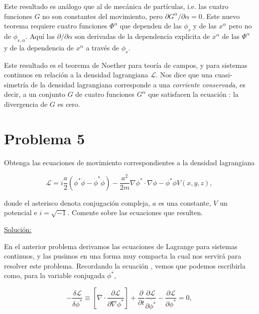 \documentclass[a4paper,10pt]{article}
\numberwithin{equation}{section}
\begin{document}
Este resultado es análogo que al de mecánica de partículas, i.e. las cuatro funciones 
$G$ no son constantes del movimiento, pero $\partial G^\alpha / \partial \alpha = 0$. Este nuevo 
teorema requiere cuatro funciones $\Phi^\alpha$ que dependen de las $\phi_s$ y de las 
$x^\alpha$ pero no de $\phi_{s,\alpha}$. Aquí las $\partial/\partial \alpha$ son derivadas 
de la dependencia explícita de $x^\alpha$ de las $\Phi^\alpha$ y de la dependencia de 
$x^\alpha$ a través de $\phi_s$. 

\vspace{.3cm}

Este resultado es el teorema de Noether para teoría de campos, y para sistemas continuos 
en relación a la densidad lagrangiana $\mathcal{L}$. Nos dice que una cuasi-simetría 
de la densidad lagrangiana corresponde a una \emph{corriente conservada}, es decir, 
a un conjunto $G$ de cuatro funciones $G^\alpha$ que satisfacen la ecuación 
: la divergencia de $G$ es cero.


\section{Problema 5}

Obtenga las ecuaciones de movimiento correspondientes a la densidad lagrangiana 

$$
\mathcal{L} = i\frac{a}{2} \left( \phi^*\dot{\phi} - \dot{\phi}^*\phi \right)  
- \frac{a^2}{2m}\nabla \phi^* \cdot \nabla \phi - \phi^*\phi V(x,y,z),
$$

donde el asterisco denota conjugación compleja, $a$ es una constante, $V$ un 
potencial e $i=\sqrt{-1}$. Comente sobre las ecuaciones que resulten.

\vspace{.3cm}

\underline{Solución:} \vspace{.3cm}

En el anterior problema derivamos las ecuaciones de Lagrange para sistemas continuos, 
y las pusimos en una forma muy compacta la cual nos servirá para resolver este problema. 
Recordando la ecuación , vemos que podemos escribirla como, para 
la variable conjugada $\phi^*$,

\begin{equation}
 - \frac{\delta \mathcal{L}}{\delta \phi^*} \equiv 
 \left[ \nabla \cdot \frac{\partial \mathcal{L}}{\partial \nabla \phi^*} \right] 
 + \frac{\partial}{\partial t}\frac{\partial \mathcal{L}}{\partial \dot{\phi^*}} 
 - \frac{\partial \mathcal{L}}{\partial \phi^*} = 0,
 \label{eq:shro1}
\end{equation}
\end{document}
